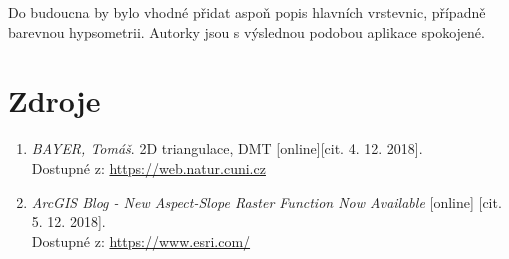 \documentclass[a4paper, 12pt]{article}
\begin{document}
Do budoucna by bylo vhodné přidat aspoň popis hlavních vrstevnic, případně barevnou hypsometrii. Autorky jsou s výslednou podobou aplikace spokojené. 
\clearpage

\section{Zdroje}
\begin{enumerate}
\item  \textsl{BAYER, Tomáš}. 2D triangulace, DMT [online][cit. 4. 12. 2018].\\
Dostupné z: \href{https://web.natur.cuni.cz/~bayertom/images/courses/Adk/adk5.pdf}{https://web.natur.cuni.cz}

\item  \textsl{ArcGIS Blog - New Aspect-Slope Raster Function Now Available} [online] [cit. 5. 12. 2018].\\
Dostupné z: \href{https://www.esri.com/arcgis-blog/products/arcgis-pro/imagery/new-aspect-slope-raster-function-now-available/?fbclid=IwAR0LX-HblA_iPSqg19aUKDW096LjaShp9r_ql8QwA_OJ26EkcFTpOEWJrlg}{https://www.esri.com/}
\end{enumerate}
\end{document}
